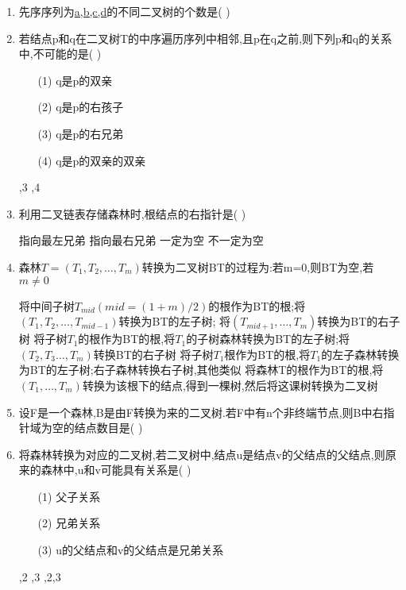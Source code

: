 \documentclass[12pt, a4paper, oneside, UTF8]{ctexbook}
\begin{document}
\begin{enumerate}
    \item \bl 先序序列为\underline{a,b,c,d}的不同二叉树的个数是(      ) 


    \item \bl 若结点p和q在二叉树T的中序遍历序列中相邻,且p在q之前,则下列p和q的关系中,不可能的是(    )
    \begin{enumerate}
        \item [(1)] q是p的双亲 
        \item [(2)] q是p的右孩子
        \item [(3)] q是p的右兄弟
        \item [(4)] q是p的双亲的双亲
    \end{enumerate}
    \begin{choices}
        ,3
        ,4
    \end{choices}



    \item 利用二叉链表存储森林时,根结点的右指针是(    ) 
    \begin{choices}
        \task 指向最左兄弟 
        \task 指向最右兄弟 
        \task 一定为空
        \task 不一定为空 
    \end{choices}


    \item 森林$T=(T_1,T_2,\ldots,T_m)$转换为二叉树BT的过程为:若m=0,则BT为空,若$m\neq 0$
    \begin{choices}[1]
        \task 将中间子树$T_{mid}(mid=(1+m)/2)$的根作为BT的根;将$(T_1,T_2,\ldots,T_{mid-1})$转换为BT的左子树;
        将$(T_{mid+1},\ldots,T_m)$转换为BT的右子树 
        \task 将子树$T_1$的根作为BT的根,将$T_1$的子树森林转换为BT的左子树;将$(T_2,T_3\ldots,T_m)$转换BT的右子树 
        \task 将子树$T_1$根作为BT的根,将$T_1$的左子森林转换为BT的左子树;右子森林转换右子树,其他类似 
        \task 将森林T的根作为BT的根,将$(T_1,\ldots,T_m)$转换为该根下的结点,得到一棵树,然后将这课树转换为二叉树 
    \end{choices}



    \item 设F是一个森林,B是由F转换为来的二叉树.若F中有n个非终端节点,则B中右指针域为空的结点数目是(    ) 


    \item \bl 将森林转换为对应的二叉树,若二叉树中,结点u是结点v的父结点的父结点,则原来的森林中,u和v可能具有关系是(   ) 
    \begin{enumerate}
        \item [(1)] 父子关系 
        \item [(2)] 兄弟关系
        \item [(3)] u的父结点和v的父结点是兄弟关系
    \end{enumerate}
    \begin{choices}
        ,2
        ,3
        ,2,3 
    \end{choices}



\end{enumerate}
\end{document}
